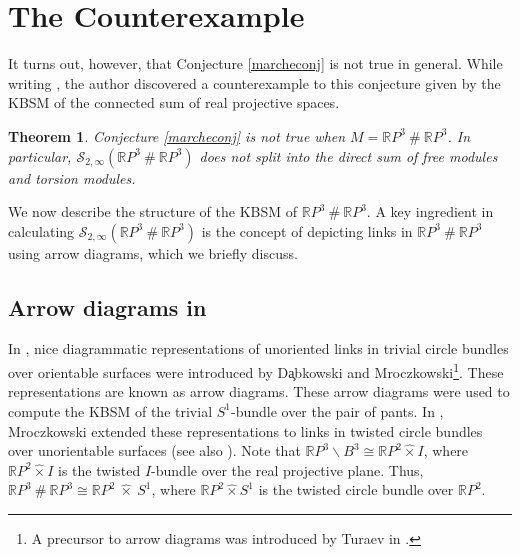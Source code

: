 \documentclass[12pt]{amsproc}
\newtheorem{theorem}{Theorem}[section]
\begin{document}
\section{The Counterexample}

It turns out, however, that Conjecture \ref{marcheconj} is not true in general. While writing \cite{mybook1}, the author discovered a counterexample to this conjecture given by the KBSM of the connected sum of real projective spaces.


\begin{theorem}

Conjecture \ref{marcheconj} is not true when $ M= \mathbb{R}P^3 \ \# \ \mathbb{R}P^3$. In particular, $\mathcal{S}_{2,\infty}(\mathbb{R}P^3 \ \# \ \mathbb{R}P^3)$ does not split into the direct sum of free modules and torsion modules. 

\end{theorem}

We now describe the structure of the KBSM of $\mathbb{R}P^3 \ \# \ \mathbb{R}P^3$. A key ingredient in calculating  $\mathcal{S}_{2,\infty}(\mathbb{R}P^3 \ \# \ \mathbb{R}P^3)$ is the concept of depicting links in $\mathbb{R}P^3 \ \# \ \mathbb{R}P^3$ using arrow diagrams, which we briefly discuss.

\subsection{Arrow diagrams in } In \cite{pairofpantss1}, nice diagrammatic representations of unoriented links in trivial circle bundles over orientable surfaces were introduced by D\c{a}bkowski and Mroczkowski\footnote{A precursor to arrow diagrams was introduced by Turaev in \cite{turaevshadow}.}. These representations are known as arrow diagrams. These arrow diagrams were used to compute the KBSM of the trivial $S^1$-bundle over the pair of pants. In \cite{rp3rp3}, Mroczkowski extended these representations to links in twisted circle bundles over unorientable surfaces (see also \cite{gabmro}). Note that $\mathbb RP^3 \smallsetminus B^3 \cong \mathbb RP^2 \hat \times I$, where $\mathbb RP^2 \hat \times I$ is the twisted $I$-bundle over the real projective plane. Thus, $\mathbb RP^3 \ \# \ \mathbb RP^3 \cong \mathbb RP^2 \ \hat\times \ S^1$, where $\mathbb RP^2 \hat \times S^1$ is the twisted circle bundle over $\mathbb RP^2$. \\ %
\end{document}
